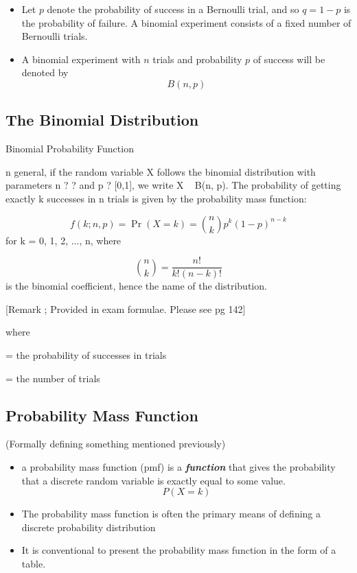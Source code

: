 


\begin{itemize}
	\item
	Let $p$ denote the probability of success in a Bernoulli trial, and so $q = 1 - p$ is the probability of failure.
	A binomial experiment consists of a fixed number of Bernoulli trials. \item A binomial experiment with $n$ trials and
	probability $p$ of success will be denoted by
	\[B(n, p)\]
\end{itemize}




\subsection{The Binomial Distribution}



Binomial Probability Function

n general, if the random variable X follows the binomial distribution with parameters n ? ? and p ? [0,1], we write X ~ B(n, p). The probability of getting exactly k successes in n trials is given by the probability mass function:

\[f(k;n,p)=\Pr(X=k)={\binom {n}{k}}p^{k}(1-p)^{n-k}\]
for k = 0, 1, 2, ..., n, where

\[{\binom {n}{k}}={\frac {n!}{k!(n-k)!}}\]
is the binomial coefficient, hence the name of the distribution. 

[Remark ; Provided in exam formulae. Please see pg 142]



where

= the probability of   successes in   trials

= the number of trials


\subsection{Probability Mass Function}
(Formally defining something mentioned previously)
\begin{itemize} \item a probability mass function (pmf) is a \textbf{\emph{function}}
	that gives the probability that a discrete random variable is exactly equal to some
	value.
	\[P(X=k)\]
	\item The probability mass function is often the primary means of defining a discrete
	probability distribution
	\item It is conventional to present the probability mass function in the form of a table.
\end{itemize}
